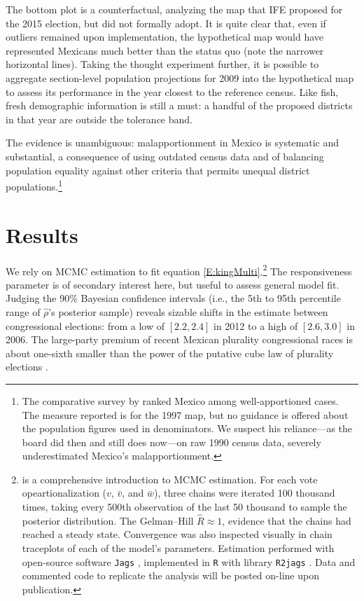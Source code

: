 \documentclass[letter,12pt]{article}
\begin{document}
The bottom plot is a counterfactual, analyzing the map that IFE proposed for the 2015 election, but did not formally adopt. It is quite clear that, even if outliers remained upon implementation, the hypothetical map would have represented Mexicans much better than the status quo (note the narrower horizontal lines). Taking the thought experiment further, it is possible to aggregate section-level population projections for 2009 into the hypothetical map to assess its performance in the year closest to the reference census. Like fish, fresh demographic information is still a must: a handful of the proposed districts in that year are outside the tolerance band. 


The evidence is unambiguous: malapportionment in Mexico is systematic and substantial, a consequence of using outdated census data and of balancing population equality against other criteria that permits unequal district populations.\footnote{The comparative survey by \citet{snyder.samuelsMalapp2004} ranked Mexico among well-apportioned cases. The measure reported is for the 1997 map, but no guidance is offered about the population figures used in denominators. We suspect his reliance---as the board did then and still does now---on raw 1990 census data, severely underestimated Mexico's malapportionment.} 

\section{Results}

We rely on MCMC estimation to fit equation \ref{E:kingMulti}.\footnote{\citet{gelman.hill.2007} is a comprehensive introduction to MCMC estimation. For each vote opeartionalization ($v$, $\bar{v}$, and $\bar{w}$), three chains were iterated 100 thousand times, taking every 500th observation of the last 50 thousand to sample the posterior distribution. The Gelman--Hill $\hat{R} \approx 1$, evidence that the chains had reached a steady state. Convergence was also inspected visually in chain traceplots of each of the model's parameters. Estimation performed with open-source software \texttt{Jags} \citep{jags.cite}, implemented in \texttt{R} \citep{r.cite} with library \texttt{R2jags} \citep{r.r2jags}. Data and commented code to replicate the analysis will be posted on-line upon publication.} The responsiveness parameter is of secondary interest here, but useful to assess general model fit. Judging the 90\% Bayesian confidence intervals (i.e., the 5th to 95th percentile range of $\hat{\rho}$'s posterior sample) reveals sizable shifts in the estimate between congressional elections: from a low of $[2.2,2.4]$ in 2012 to a high of $[2.6,3.0]$ in 2006. The large-party premium of recent Mexican plurality congressional races is about one-sixth smaller than the power of the putative cube law of plurality elections \citep{taagepera.CubeLaw.1973}. 
\end{document}
